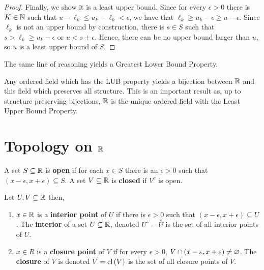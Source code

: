\begin{proof}
	Finally, we show it is a least upper bound. Since for every \(\epsilon > 0\) there is \(K \in \mathbb{N}\) such that \(u - \ell_{k} \le u_{k} - \ell_{k} < \epsilon\), we have that \(\ell_{k} \ge u_{k} - \epsilon \ge u - \epsilon\). Since \(\ell_{k}\) is not an upper bound by construction, there is \(s \in S\) such that \(s > \ell_{k} \ge u_{k} - \epsilon\) or \( u < s + \epsilon\). Hence, there can be no upper bound larger than \(u\), so \(u\) is a least upper bound of \(S\).
\end{proof}
The same line of reasoning yields a Greatest Lower Bound Property.
\begin{remark}
	Any ordered field which has the LUB property yields a bijection between \(\mathbb{R}\) and this field which preserves all structure. This is an important result as, up to structure preserving bijections, \(\mathbb{R}\) is the unique ordered field with the Least Upper Bound Property.
\end{remark}
\section{Topology on \(\mathbb{R}\)}
\begin{definition}
	A set \(S \subseteq \mathbb{R}\) is \textbf{open} if for each \(x \in S\) there is an \(\epsilon > 0\) such that \(\left( x-\epsilon, x + \epsilon \right)  \subseteq S\). A set \(V \subseteq \mathbb{R}\) is \textbf{closed} if \(V^{c} \) is open.
\end{definition}
\begin{definition}[]
	Let \(U, V \subseteq \mathbb{R}\) then,
	\begin{enumerate}
		\item \(x \in \mathbb{R}\) is a \textbf{interior point} of \(U\) if there is \(\epsilon > 0\) such that \(\left( x-\epsilon, x + \epsilon \right)  \subseteq U\). The \textbf{interior} of a set \(U \subseteq \mathbb{R}\), denoted \(U^{\circ} = \overset{\circ}{U}\) is the set of all interior points of \(U\).
		\item \(x \in R\) is a \textbf{closure point} of \(V\) if for every \(\epsilon > 0\), \( V \cap \left( x-\varepsilon, x + \varepsilon \right) \neq \varnothing\). The \textbf{closure} of \(V\) is denoted \(\overline{V} = \operatorname{cl} \left( V \right) \) is the set of all closure points of \(V\).
	\end{enumerate}
\end{definition}
